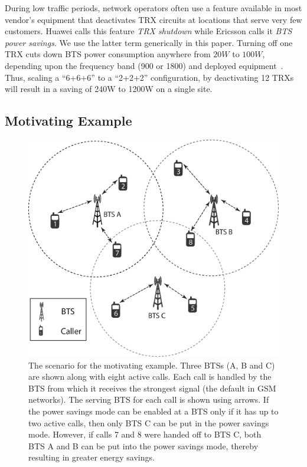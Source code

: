 During low traffic periods, network operators often use a feature available in most vendor's equipment that deactivates TRX circuits at locations that
serve very few customers. Huawei calls this feature \textit{TRX shutdown} while Ericsson calls it \textit{BTS power savings}. We use the latter term generically in this paper. Turning off one TRX cuts down BTS power consumption anywhere from $20W$
to $100W$, depending upon the frequency band (900 or 1800) and
deployed
equipment~\cite{Lorincz:BTS-Measure:Sensors:2012,flexibsc}.
Thus, scaling a ``6+6+6'' to a ``2+2+2'' configuration, by deactivating 12
TRXs will result in a saving of
240W to 1200W on a single site.

\subsection{Motivating Example}

\begin{figure}
\centering
\includegraphics[width=1\textwidth]{pics/ilyas3.eps}
\caption{The scenario for the motivating example. Three BTSs (A, B and C) are shown along with eight active calls. Each call is handled by the BTS from which it receives the strongest signal (the default in GSM networks). The serving BTS for each call is shown using arrows. If the power savings mode can be enabled at a BTS only if it has up to two active calls, then only BTS C can be put in the power savings mode. However, if calls 7 and 8 were handed off to BTS C, both BTS A and B can be put into the power savings mode, thereby resulting in greater energy savings.}
\label{fig:illustrationall}
\end{figure}

